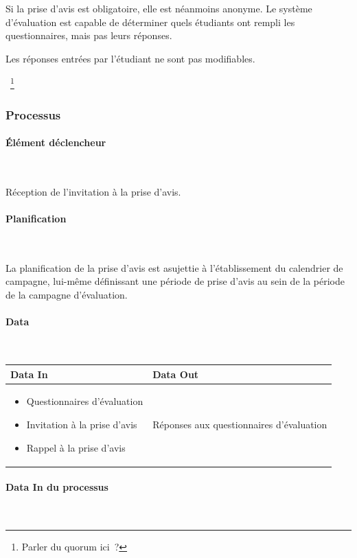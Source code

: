 \documentclass[a4paper,11pt]{report}
\begin{document}
Si la prise d'avis est obligatoire, elle est néanmoins anonyme. Le système d'évaluation est capable de déterminer quels étudiants ont rempli les questionnaires, mais pas leurs réponses.

Les réponses entrées par l'étudiant ne sont pas modifiables.

~\footnote{Parler du quorum ici~?}

\subsubsection{Processus}
\paragraph{Élément déclencheur}~\newline{}

Réception de l'invitation à la prise d'avis.

\paragraph{Planification}~\newline{}

La planification de la prise d'avis est asujettie à l'établissement du calendrier de campagne, lui-même définissant une période de prise d'avis au sein de la période de la campagne d'évaluation.

\paragraph{Data}~\newline{}

\begin{tabularx}{\linewidth}{|X|X|} \hline
Data In & Data Out \\ \hline
\begin{itemize}
	\item Questionnaires d'évaluation 
	\item Invitation à la prise d'avis
	\item Rappel à la prise d'avis
\end{itemize}
& Réponses aux questionnaires d'évaluation\\ \hline
\end{tabularx}

\paragraph{Data In du processus}~\newline{}
\end{document}
